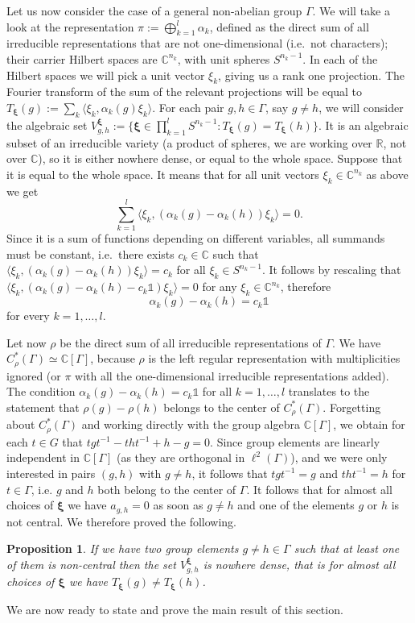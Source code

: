\documentclass[12pt]{amsart}
\newtheorem{prop}[thm]{Proposition}
\theoremstyle{definition}
\theoremstyle{definition}
\theoremstyle{definition}
\theoremstyle{definition}
\numberwithin{equation}{section}
\begin{document}
Let us now consider the case of a general non-abelian group $\Gamma$. We will take a look at the representation $\pi:=\bigoplus_{k=1}^l \alpha_k$, defined as the direct sum of all irreducible representations that are not one-dimensional (i.e.\ not characters); their carrier Hilbert spaces are $\mathbb{C}^{n_{k}}$, with unit spheres $S^{n_{k}-1}$. In each of the Hilbert spaces we will pick a unit vector $\xi_k$, giving us a rank one projection. The Fourier transform of the sum of the relevant projections will be equal to $T_{\bm{\xi}}(g) := \sum_{k} \langle \xi_k, \alpha_k(g) \xi_k\rangle$. For each pair $g,h \in \Gamma$, say $g \neq h$, we will consider the algebraic set $V_{g,h}^{\bm{\xi}}:= \{\bm{\xi} \in \prod_{k=1}^l S^{n_{k}-1}: T_{\bm{\xi}}(g) = T_{\bm{\xi}}(h)\}$. It is an algebraic subset of an irreducible variety (a product of spheres, we are working over $\mathbb{R}$, not over $\mathbb{C}$), so it is either nowhere dense, or equal to the whole space. Suppose that it is equal to the whole space. It means that for all unit vectors $\xi_k \in \mathbb{C}^{n_k}$ as above we get
\[
\sum_{k=1}^l \langle \xi_k, (\alpha_k(g)-\alpha_k(h))\xi_k\rangle = 0.
\]
Since it is a sum of functions depending on different variables, all summands must be constant, i.e.\ there exists $c_k \in \mathbb{C}$ such that $\langle \xi_k, (\alpha_k(g) - \alpha_k(h)) \xi_k\rangle = c_k$ for all $\xi_k \in S^{n_k -1}$. It follows by rescaling that $\langle \xi_k, (\alpha_k(g) - \alpha_k(h) - c_k \mathds{1}) \xi_k\rangle = 0$ for any $\xi_k \in \mathbb{C}^{n_k}$, therefore
\[
\alpha_k(g) - \alpha_k(h) = c_k \mathds{1}
\]
for every $k =1, \ldots, l$.

Let now $\rho$ be the direct sum of all irreducible representations of $\Gamma$. We have $C^{\ast}_{\rho}(\Gamma)\simeq \mathbb{C}[\Gamma]$, because $\rho$ is the left regular representation with multiplicities ignored (or $\pi$ with all the one-dimensional irreducible representations added). The condition $\alpha_k(g) - \alpha_k(h) = c_{k}\mathds{1}$ for all $k =1,\ldots, l$ translates to the statement that $\rho(g) - \rho(h)$ belongs to the center of $C^{\ast}_{\rho}(\Gamma)$. Forgetting about $C^{\ast}_{\rho}(\Gamma)$ and working directly with the group algebra $\mathbb{C}[\Gamma]$, we obtain for each $t\in G$ that $tgt^{-1} - tht^{-1} + h - g=0$. Since group elements are linearly independent in $\mathbb{C}[\Gamma]$ (as they are orthogonal in $\ell^{2}(\Gamma)$), and we were only interested in pairs $(g,h)$ with $g\neq h$, it follows that $tgt^{-1} = g$ and $tht^{-1}=h$ for $t\in \Gamma$, i.e. $g$ and $h$ both belong to the center of $\Gamma$. It follows that for almost all choices of $\bm{\xi}$ we have $a_{g,h}=0$ as soon as $g\neq h$ and one of the elements $g$ or $h$ is not central. We therefore proved the following.
\begin{prop}
If we have two group elements $g\neq h\in \Gamma$ such that at least one of them is non-central then the set $V^{\bm{\xi}}_{g,h}$ is nowhere dense, that is for almost all choices of $\bm{\xi}$ we have $T_{\bm{\xi}}(g) \neq T_{\bm{\xi}}(h)$.
\end{prop}
We are now ready to state and prove the main result of this section.
\end{document}
